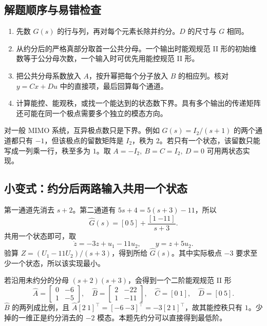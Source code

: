 \subsection{解题顺序与易错检查}

\begin{enumerate}
    \item 先数 $G(s)$ 的行与列，再对每个元素长除并约分。$D$ 的尺寸与 $G$ 相同。
    \item 从约分后的严格真部分取首一公共分母。一个输出时能观规范 II 形的初始维数等于公分母次数，一个输入时可优先用能控规范 II 形。
    \item 把公共分母系数放入 $A$，按升幂把每个分子放入 $B$ 的相应列。核对 $y=Cx+Du$ 中的直接项，最后回算每个通道。
    \item 计算能控、能观秩，或找一个能达到的状态数下界。具有多个输出的传递矩阵还可能在同一个极点需要多个独立的模态方向。
\end{enumerate}

\begin{note}
    对一般 MIMO 系统，互异极点数只是下界。例如
    $G(s)=I_2/(s+1)$ 的两个通道都只有 $-1$，但该极点的留数矩阵是 $I_2$，秩为 $2$。若只有一个状态，该留数只能写成一列乘一行，秩至多为 $1$。取 $A=-I_2,\ B=C=I_2,\ D=0$ 可用两状态实现。
\end{note}

\subsection{小变式：约分后两路输入共用一个状态}


\sol
第一通道先消去 $s+2$。第二通道有 $5s+4=5(s+3)-11$，所以
\[
   \widehat G(s)=[0\ 5]+\frac{[1\ {-11}]}{s+3}.
\]
共用一个状态即可，取
\[
   \dot z=-3z+u_1-11u_2,\qquad y=z+5u_2 .
\]
验算 $Z=(U_1-11U_2)/(s+3)$，得到所给 $\widehat G(s)$。其中实际极点 $-3$ 要求至少一个状态，所以该实现最小。

若沿用未约分的分母 $(s+2)(s+3)$，会得到一个二阶能观规范 II 形
\[
   \widehat A=\begin{bmatrix}0&-6\\1&-5\end{bmatrix},\quad
   \widehat B=\begin{bmatrix}2&-22\\1&-11\end{bmatrix},\quad
   \widehat C=[0\ 1],\quad\widehat D=[0\ 5].
\]
$\widehat B$ 的两列成比例，且 $\widehat A[2\ 1]^\top=[-6\ {-3}]^\top=-3[2\ 1]^\top$，故其能控秩只有 $1$。少掉的一维正是约分消去的 $-2$ 模态。本题先约分可以直接得到最低阶。
